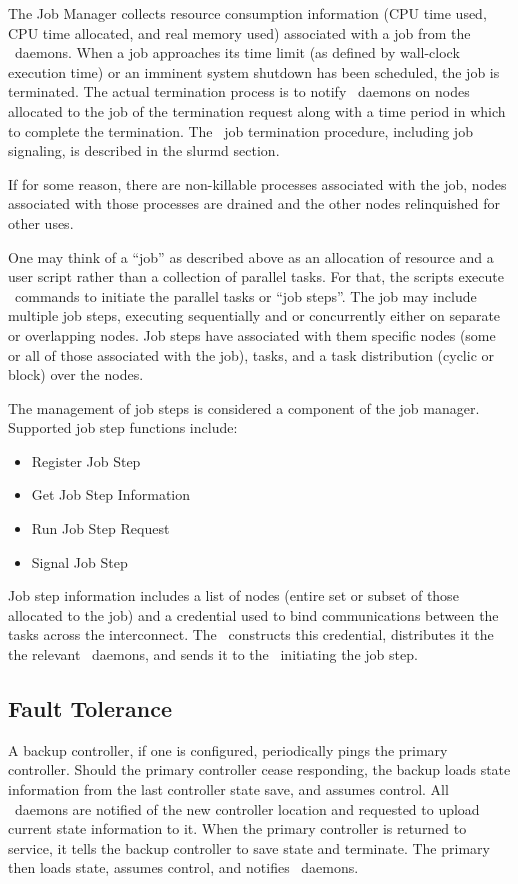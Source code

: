 The Job Manager collects resource consumption information (CPU
time used, CPU time allocated, and real memory used) associated with
a job from the \slurmd\ daemons.  When a job approaches its time limit
(as defined by wall-clock execution time) or an imminent system shutdown
has been scheduled, the job is terminated.  The actual termination
process is to notify \slurmd\ daemons on nodes allocated to the job of
the termination request along with a time period in which to complete
the termination.  The \slurmd\ job termination procedure, including job
signaling, is described in the slurmd section.

If for some reason, there are non-killable processes associated with 
the job, nodes associated with those processes are drained and 
the other nodes relinquished for other uses.

One may think of a ``job'' as described above as an allocation of resource 
and a user script rather than a collection of parallel tasks. For that, 
the scripts execute \srun\ commands to initiate the parallel tasks 
or ``job steps''. The job may include multiple job steps, executing 
sequentially and or concurrently either on separate or overlapping nodes. 
Job steps have associated with them specific nodes (some or all of those 
associated with the job), tasks, and a task distribution (cyclic or 
block) over the nodes. 

The management of job steps is considered a component of the job 
manager. Supported job step functions include:
\begin{itemize}
\item Register Job Step
\item Get Job Step Information
\item Run Job Step Request
\item Signal Job Step
\end{itemize}
Job step information includes a list of 
nodes (entire set or subset of those allocated to the job) and a 
credential used to bind communications between the tasks across 
the interconnect. The \slurmctld\ constructs this credential, 
distributes it the the relevant \slurmd\ daemons, and sends it to 
the \srun\ initiating the job step.

\subsection{Fault Tolerance}

A backup controller, if one is configured, periodically pings
the primary controller.  Should the primary controller cease
responding, the backup loads state information from the last 
controller state save, and assumes control.  All \slurmd\ daemons
are notified of the new controller location and requested to upload
current state information to it.  When the primary controller is
returned to service, it tells the backup controller to save
state and terminate.  The primary then loads state, assumes control,
and notifies \slurmd\ daemons.

